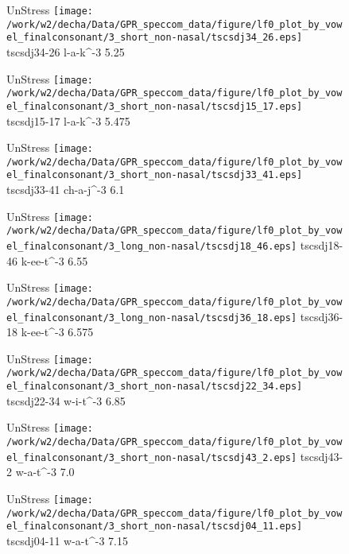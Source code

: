 \documentclass{article}
\begin{document}
\begin{figure}[t]
\begin{minipage}[b]{.24\textwidth}
UnStress
\centering
\texttt{[image: /work/w2/decha/Data/GPR\_speccom\_data/figure/lf0\_plot\_by\_vowel\_finalconsonant/3\_short\_non-nasal/tscsdj34\_26.eps]}
tscsdj34-26 l-a-k\textasciicircum-3 5.25
\end{minipage}
\begin{minipage}[b]{.24\textwidth}
UnStress
\centering
\texttt{[image: /work/w2/decha/Data/GPR\_speccom\_data/figure/lf0\_plot\_by\_vowel\_finalconsonant/3\_short\_non-nasal/tscsdj15\_17.eps]}
tscsdj15-17 l-a-k\textasciicircum-3 5.475
\end{minipage}
\begin{minipage}[b]{.24\textwidth}
UnStress
\centering
\texttt{[image: /work/w2/decha/Data/GPR\_speccom\_data/figure/lf0\_plot\_by\_vowel\_finalconsonant/3\_short\_non-nasal/tscsdj33\_41.eps]}
tscsdj33-41 ch-a-j\textasciicircum-3 6.1
\end{minipage}
\begin{minipage}[b]{.24\textwidth}
UnStress
\centering
\texttt{[image: /work/w2/decha/Data/GPR\_speccom\_data/figure/lf0\_plot\_by\_vowel\_finalconsonant/3\_long\_non-nasal/tscsdj18\_46.eps]}
tscsdj18-46 k-ee-t\textasciicircum-3 6.55
\end{minipage}
\end{figure}

\begin{figure}[t]
\begin{minipage}[b]{.24\textwidth}
UnStress
\centering
\texttt{[image: /work/w2/decha/Data/GPR\_speccom\_data/figure/lf0\_plot\_by\_vowel\_finalconsonant/3\_long\_non-nasal/tscsdj36\_18.eps]}
tscsdj36-18 k-ee-t\textasciicircum-3 6.575
\end{minipage}
\begin{minipage}[b]{.24\textwidth}
UnStress
\centering
\texttt{[image: /work/w2/decha/Data/GPR\_speccom\_data/figure/lf0\_plot\_by\_vowel\_finalconsonant/3\_short\_non-nasal/tscsdj22\_34.eps]}
tscsdj22-34 w-i-t\textasciicircum-3 6.85
\end{minipage}
\begin{minipage}[b]{.24\textwidth}
UnStress
\centering
\texttt{[image: /work/w2/decha/Data/GPR\_speccom\_data/figure/lf0\_plot\_by\_vowel\_finalconsonant/3\_short\_non-nasal/tscsdj43\_2.eps]}
tscsdj43-2 w-a-t\textasciicircum-3 7.0
\end{minipage}
\begin{minipage}[b]{.24\textwidth}
UnStress
\centering
\texttt{[image: /work/w2/decha/Data/GPR\_speccom\_data/figure/lf0\_plot\_by\_vowel\_finalconsonant/3\_short\_non-nasal/tscsdj04\_11.eps]}
tscsdj04-11 w-a-t\textasciicircum-3 7.15
\end{minipage}
\end{figure}
\end{document}
